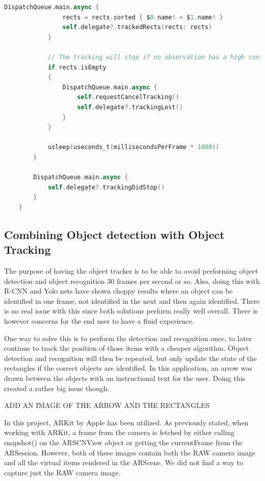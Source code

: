 \begin{lstlisting}[language=swift]
            DispatchQueue.main.async {
                rects = rects.sorted { $0.name! < $1.name! }
                self.delegate?.trackedRects(rects: rects)
            }
            
            // The tracking will stop if no observation has a high confidence value
            if rects.isEmpty
            {
                DispatchQueue.main.async {
                    self.requestCancelTracking()
                    self.delegate?.trackingLost()
                }
            }

            usleep(useconds_t(millisecondsPerFrame * 1000))
        }
        
        DispatchQueue.main.async {
            self.delegate?.trackingDidStop()
        }
    }
\end{lstlisting}


\subsection{Combining Object detection with Object Tracking}
The purpose of having the object tracker is to be able to avoid performing object detection and object recognition 30 frames per second or so. Also, doing this with R-CNN and Yolo nets have shown choppy results where an object can be identified in one frame, not identified in the next and then again identified.
There is no real issue with this since both solutions perform really well overall. There is however concerns for the end user to have a fluid experience.

One way to solve this is to perform the detection and recognition once, to later continue to track the position of those items with a cheaper algorithm.
Object detection and recognition will then be repeated, but only update the state of the rectangles if the correct objects are identified.
In this application, an arrow was drawn between the objects with an instructional text for the user. Doing this created a rather big issue though.

ADD AN IMAGE OF THE ARROW AND THE RECTANGLES

In this project, ARKit by Apple has been utilized. As previously stated, when working with ARKit, a frame from the camera is fetched by either calling snapshot() on the ARSCNView object or getting the currentFrame from the ARSession.
However, both of these images contain both the RAW camera image and all the virtual items rendered in the ARScene. We did not find a way to capture just the RAW camera image.

